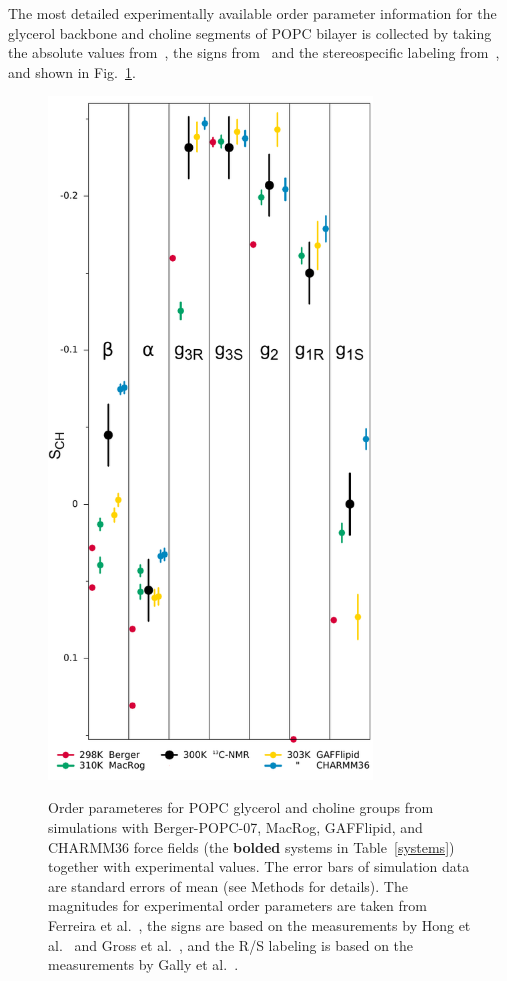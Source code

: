 \documentclass[journal=jpcbfk,manuscript=article]{achemso}
\begin{document}
The most detailed experimentally available order parameter information for the glycerol backbone and choline 
segments of POPC bilayer is collected by taking the absolute values from~\cite{ferreira13}, the signs from~\cite{hong95a,hong95b,gross97} 
and the stereospecific labeling from~\cite{gally81}, and shown in Fig.~\ref{HGorderparameters2}.
\begin{figure}[]
  \centering
  \includegraphics[width=8.6cm]{../Fig/stereospecificOPs.pdf} \\
  \caption{\label{HGorderparameters2}
  Order parameteres for POPC glycerol and choline groups
  from simulations with Berger-POPC-07, MacRog, GAFFlipid, and CHARMM36 force fields
  (the {\bf bolded} systems in Table~\ref{systems})
  together with experimental values.
  The error bars of simulation data are standard errors of mean (see Methods for details).
  The magnitudes for experimental order parameters are taken from Ferreira et al.~\cite{ferreira13},
  the signs are based on the measurements by Hong et al.~\cite{hong95a,hong95b} 
  and Gross et al.~\cite{gross97}, and the R/S labeling is based on the measurements by Gally et al.~\cite{gally81}.
}
\end{figure}
\end{document}
